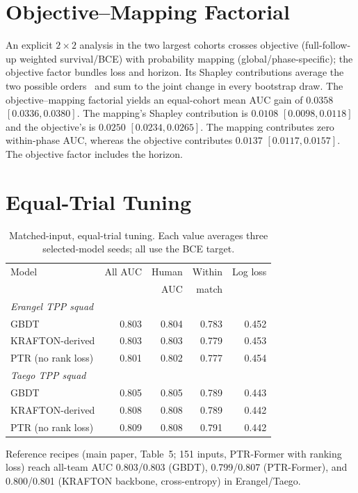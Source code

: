\documentclass[sigconf,anonymous,nonacm]{acmart}
\begin{document}
\section{Objective--Mapping Factorial}
An explicit $2\times2$ analysis in the two largest cohorts crosses objective (full-follow-up weighted survival/BCE) with probability mapping (global/phase-specific); the objective factor bundles loss and horizon. Its Shapley contributions average the two possible orders~\cite{Shorrocks13} and sum to the joint change in every bootstrap draw. The objective--mapping factorial yields an equal-cohort mean AUC gain of $0.0358$ $[0.0336,\allowbreak 0.0380]$. The mapping's Shapley contribution is $0.0108$ $[0.0098,\allowbreak 0.0118]$ and the objective's is $0.0250$ $[0.0234,\allowbreak 0.0265]$. The mapping contributes zero within-phase AUC, whereas the objective contributes $0.0137$ $[0.0117,\allowbreak 0.0157]$. The objective factor includes the horizon.

\section{Equal-Trial Tuning}
\begin{table}[t]
\centering\footnotesize
\caption{Matched-input, equal-trial tuning. Each value averages three selected-model seeds; all use the BCE target.}
\label{tab:tuning}
\setlength{\tabcolsep}{3pt}
\begin{tabular}{lrrrr}
\toprule
Model & All AUC & Human & Within & Log loss \\
 & & AUC & match & \\
\midrule
\multicolumn{5}{l}{\emph{Erangel TPP squad}} \\
GBDT & 0.803 & 0.804 & 0.783 & 0.452 \\
KRAFTON-derived & 0.803 & 0.803 & 0.779 & 0.453 \\
PTR (no rank loss) & 0.801 & 0.802 & 0.777 & 0.454 \\
\multicolumn{5}{l}{\emph{Taego TPP squad}} \\
GBDT & 0.805 & 0.805 & 0.789 & 0.443 \\
KRAFTON-derived & 0.808 & 0.808 & 0.789 & 0.442 \\
PTR (no rank loss) & 0.809 & 0.808 & 0.791 & 0.442 \\
\bottomrule
\end{tabular}
\smallskip
\parbox{\columnwidth}{\scriptsize Reference recipes (main paper, Table~5; 151 inputs, PTR-Former with ranking loss) reach all-team AUC 0.803/0.803 (GBDT), 0.799/0.807 (PTR-Former), and 0.800/0.801 (KRAFTON backbone, cross-entropy) in Erangel/Taego.}
\end{table}
\end{document}
